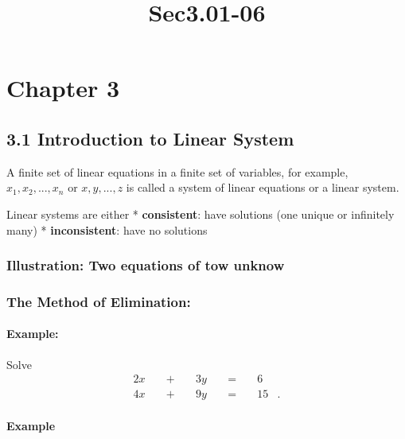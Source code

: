 \documentclass[11pt]{article}
\title{Sec3.01-06}
\begin{document}
    
    \maketitle
    
    

    
    \hypertarget{chapter-3}{%
\section{Chapter 3}\label{chapter-3}}

\hypertarget{introduction-to-linear-system}{%
\subsection{3.1 Introduction to Linear
System}\label{introduction-to-linear-system}}

A finite set of linear equations in a finite set of variables, for
example, \({\displaystyle x_{1},x_{2},...,x_{n}}\) or
\({\displaystyle x,y,...,z}\) is called a system of linear equations or
a linear system.

Linear systems are either * \textbf{consistent}: have solutions (one
unique or infinitely many) * \textbf{inconsistent}: have no solutions

\hypertarget{illustration-two-equations-of-tow-unknow}{%
\subsubsection{Illustration: Two equations of tow
unknow}\label{illustration-two-equations-of-tow-unknow}}

\hypertarget{the-method-of-elimination}{%
\subsubsection{The Method of
Elimination:}\label{the-method-of-elimination}}

\hypertarget{example}{%
\paragraph{Example:}\label{example}}

Solve \[
{\begin{alignedat}{5}2x&&\;+\;&&3y&&\;=\;&&6&\\4x&&\;+\;&&9y&&\;=\;&&15&.\end{alignedat}}
\]

\hypertarget{example-1}{%
\paragraph{Example}\label{example-1}}
\end{document}
